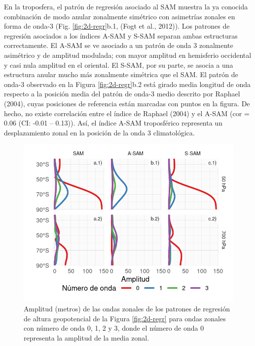 \documentclass[12pt,oneside]{reedthesis}
\begin{document}
En la troposfera, el patrón de regresión asociado al SAM muestra la ya conocida combinación de modo anular zonalmente simétrico con asimetrías zonales en forma de onda-3 (Fig. \ref{fig:2d-regr}b.1, (Fogt et al., 2012)).
Los patrones de regresión asociados a los índices A-SAM y S-SAM separan ambas estructuras correctamente.
El A-SAM se ve asociado a un patrón de onda 3 zonalmente asimétrico y de amplitud modulada; con mayor amplitud en hemisferio occidental y casi nula amplitud en el oriental.
El S-SAM, por su parte, se asocia a una estructura anular mucho más zonalmente simétrica que el SAM.
El patrón de onda-3 observado en la Figura \ref{fig:2d-regr}b.2 está girado media longitud de onda respecto a la posición media del patrón de onda-3 medio descrito por Raphael (2004), cuyas posiciones de referencia están marcadas con puntos en la figura.
De hecho, no existe correlación entre el índice de Raphael (2004) y el A-SAM (cor = 0.06 (CI: -0.01 -- 0.13)).
Así, el índice A-SAM troposférico representa un desplazamiento zonal en la posición de la onda 3 climatológica.



\begin{figure}
\includegraphics{figures/30-sam/wave-amplitude-1} \caption{Amplitud (metros) de las ondas zonales de los patrones de regresión de altura geopotencial de la Figura \ref{fig:2d-regr} para ondas zonales con número de onda 0, 1, 2 y 3, donde el número de onda 0 representa la amplitud de la media zonal.}\label{fig:wave-amplitude}
\end{figure}
\end{document}
